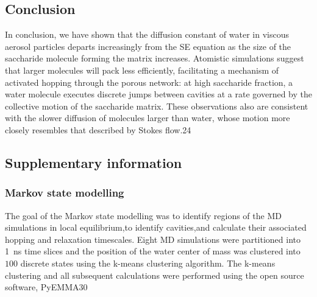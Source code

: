 \subsection{Conclusion}
In conclusion, we have shown that the diffusion constant of water in viscous aerosol particles departs increasingly from the SE equation as the size of the saccharide molecule forming the matrix increases. Atomistic simulations suggest that larger molecules will pack less efficiently, facilitating a mechanism of activated hopping through the porous network: at high saccharide fraction, a water molecule executes discrete jumps between cavities at a rate governed by the collective motion of the saccharide matrix. These observations also are consistent with the slower diffusion of molecules larger than water, whose motion more closely resembles that described by Stokes flow.24

\subsection{Supplementary information}
\subsubsection{Markov state modelling}
The goal of the Markov state modelling was to identify regions of the MD simulations in local equilibrium,to identify cavities,and calculate their associated hopping and relaxation timescales. Eight MD simulations were partitioned into \SI{1}{\nano\second} time slices and the position of the water center of mass was clustered into $100$ discrete states using the k-means clustering algorithm. The k-means clustering and all subsequent calculations were performed using the open source software, PyEMMA30

